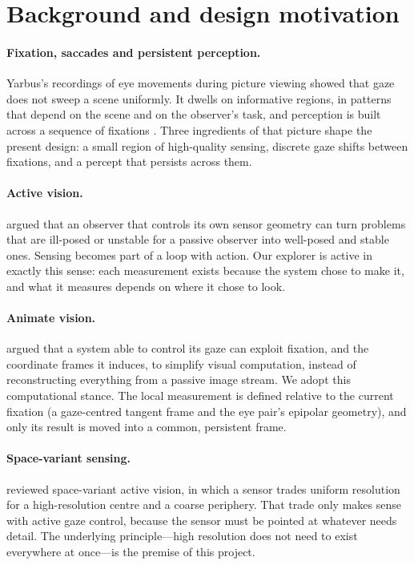 \documentclass[11pt,a4paper]{article}
\begin{document}
\section{Background and design motivation}\label{sec:background}

\paragraph{Fixation, saccades and persistent perception.} Yarbus's recordings of eye movements during picture viewing
showed that gaze does not sweep a scene uniformly. It dwells on informative regions, in patterns that depend on the
scene and on the observer's task, and perception is built across a sequence of fixations
\citep{yarbus1967}. Three ingredients of that picture shape the present design: a small region of high-quality
sensing, discrete gaze shifts between fixations, and a percept that persists across them.

\paragraph{Active vision.} \citet{aloimonos1988} argued that an observer that controls its own sensor geometry can turn
problems that are ill-posed or unstable for a passive observer into well-posed and stable ones. Sensing becomes part of
a loop with action. Our explorer is active in exactly this sense: each measurement exists because the system chose to
make it, and what it measures depends on where it chose to look.

\paragraph{Animate vision.} \citet{ballard1991} argued that a system able to control its gaze can exploit fixation, and
the coordinate frames it induces, to simplify visual computation, instead of reconstructing everything from a passive
image stream. We adopt this computational stance. The local measurement is defined relative to the current fixation (a
gaze-centred tangent frame and the eye pair's epipolar geometry), and only its result is moved into a common,
persistent frame.

\paragraph{Space-variant sensing.} \citet{schwartz1995} reviewed space-variant active vision, in which a sensor trades
uniform resolution for a high-resolution centre and a coarse periphery. That trade only makes sense with active gaze
control, because the sensor must be pointed at whatever needs detail. The underlying principle---high resolution does
not need to exist everywhere at once---is the premise of this project.
\end{document}
